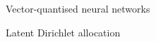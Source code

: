\documentclass[final]{beamer}
\newcommand{\zeroshot}[1]{\textcolor{tablue20blue}{#1}}
\newcommand{\highqual}[1]{\textcolor{tablue20green}{#1}}
\newcommand{\mybf}[1]{\textcolor{darkestgray}{\textbf{#1}}}
\newlength{\columnheight}
\begin{document}
\begin{frame}[t]
\begin{columns}[T]
\begin{column}{.33\linewidth}
\begin{minipage}[T]{.97\textwidth}
{\begin{block}{Vector-quantised neural networks}
    
\end{block}

\begin{block}{Latent Dirichlet allocation}
\end{block}


}\end{minipage}
\end{column}



\begin{column}{.33\linewidth}
\centering
\begin{minipage}[T]{.97\textwidth}\parbox[t][\columnheight]{\textwidth}{

}
\end{minipage}
\end{column}
\end{columns}
\end{frame}
\end{document}
